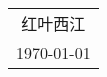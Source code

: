\documentclass[10pt, a4paper]{book}
\begin{document}
\begin{flushright}
    \begin{tabular}{c}
        红叶西江\\
        \today
    \end{tabular}
\end{flushright}

\newpage
{}
\setcounter{page}{1}

\tableofcontents

\newpage
\setcounter{page}{1}




\end{document}
